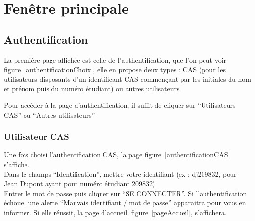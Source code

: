 \documentclass[a4paper,11pt,final]{report}
\begin{document}
\chapter{Fenêtre principale}
\section{Authentification}
La première page affichée est celle de l'authentification, que l'on peut voir figure~\ref{authentificationChoix}, elle en propose deux types : CAS (pour les utilisateurs disposants d'un identificant CAS commençant par les initiales du nom et prénom puis du numéro étudiant) ou autres utilisateurs.\\
\noindent\begin{minipage}{\linewidth}%
\label{authentificationChoix}
\end{minipage}

Pour accéder à la page d'authentification, il suffit de cliquer sur ``Utilisateurs CAS'' ou ``Autres utilisateurs''
\subsection{Utilisateur CAS}
Une fois choisi l'authentification CAS, la page figure~\ref{authentificationCAS} s'affiche.\\
Dans le champs ``Identification'', mettre votre identifiant (ex : dj209832, pour Jean Dupont ayant pour numéro étudiant 209832).\\
Entrer le mot de passe puis cliquer sur ``SE CONNECTER''. Si l'authentification échoue, une alerte ``Mauvais identifiant / mot de passe'' apparaitra pour vous en informer. Si elle réussit, la page d'accueil, figure~\ref{pageAccueil}, s'affichera. 
\end{document}
